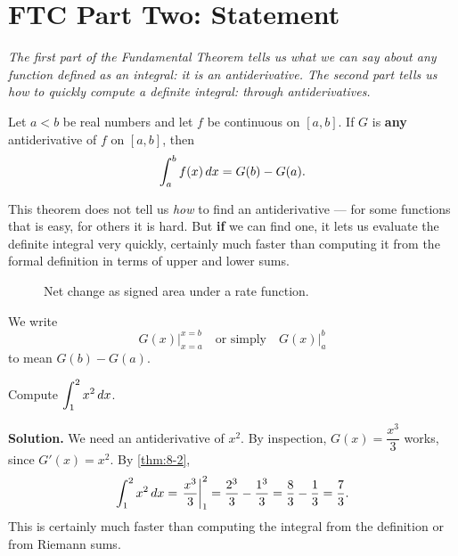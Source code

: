 \section{FTC Part Two: Statement}
\label{sec:8.5}

\textit{The first part of the Fundamental Theorem tells us what we can say about any function defined as an integral: it is an antiderivative.  The second part tells us how to quickly compute a definite integral: through antiderivatives.}

\begin{theorem}
\label{thm:8-2}
Let $a < b$ be real numbers and let $f$ be continuous on $[a,b]$.  If $G$ is \textbf{any} antiderivative of $f$ on $[a,b]$, then
\[
  \int_{a}^{b} f(x)\,dx = G(b) - G(a).
\]
\end{theorem}

\begin{remark}
This theorem does not tell us \textit{how} to find an antiderivative --- for some functions that is easy, for others it is hard.  But \textbf{if} we can find one, it lets us evaluate the definite integral very quickly, certainly much faster than computing it from the formal definition in terms of upper and lower sums.
\end{remark}

\begin{figure}[ht]
  \centering
  
  \caption{Net change as signed area under a rate function.}
  \label{fig:net-change-signed-area}
\end{figure}

\begin{definition}
\label{def:8-4}
We write
\[
  \left. G(x) \right\rvert_{x=a}^{x=b} \quad \text{or simply} \quad \left. G(x) \right\rvert_{a}^{b}
\]
to mean $G(b) - G(a)$.
\end{definition}

\begin{example}
\label{ex:8-8}
Compute $\displaystyle\int_{1}^{2} x^{2}\,dx$.

\textbf{Solution.}  We need an antiderivative of $x^{2}$.  By inspection, $G(x) = \dfrac{x^{3}}{3}$ works, since $G'(x) = x^{2}$.  By \cref{thm:8-2},
\[
  \int_{1}^{2} x^{2}\,dx = \left.\frac{x^{3}}{3}\right\rvert_{1}^{2} = \frac{2^{3}}{3} - \frac{1^{3}}{3} = \frac{8}{3} - \frac{1}{3} = \frac{7}{3}.
\]
This is certainly much faster than computing the integral from the definition or from Riemann sums.
\end{example}

